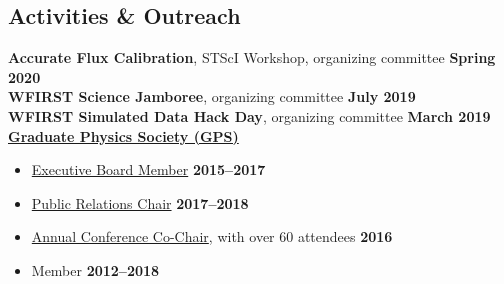 \documentclass[margin]{res}
\begin{document}
\begin{resume}
\section{Activities \& Outreach} %


\textbf{Accurate Flux Calibration}, STScI Workshop, organizing committee \hfill \textbf{Spring 2020}\\
\textbf{WFIRST Science Jamboree}, organizing committee \hfill \textbf{July 2019}\\
\textbf{WFIRST Simulated Data Hack Day}, organizing committee \hfill \textbf{March 2019}\\
\textbf{\href{gradphysics.nd.edu}{Graduate Physics Society (GPS)}}
\begin{itemize}\itemsep -2pt
    \item[] \href{http://gradphysics.nd.edu/about-us/executive-board/}{Executive Board Member} \hfill {\bf 2015--2017}
    \item[] \href{http://gradphysics.nd.edu/about-us/committee-chairs/}{Public Relations Chair} \hfill {\bf 2017--2018}
    \item[] \href{http://gradphysics.nd.edu/conference/gpsac-2016/}{Annual Conference Co-Chair}, with over 60 attendees \hfill {\bf 2016}
    \item[] Member \hfill {\bf 2012--2018}
\end{itemize} \vspace{-12pt}

\end{resume}
\end{document}
